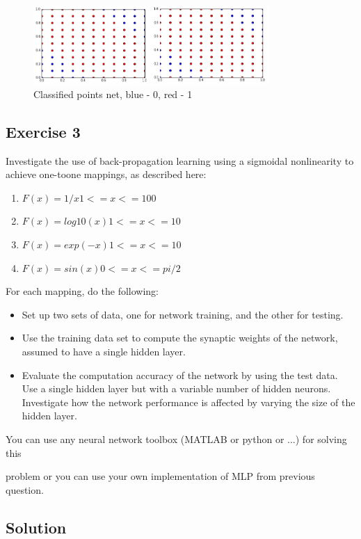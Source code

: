 \documentclass[a4paper, 12pt]{article}
\begin{document}
\begin{figure}[h]
  \centering
  \caption{Classified points net, blue - 0, red - 1 \label{fig:results}}
  \includegraphics[width=0.8\textwidth]{results}
\end{figure}

\subsection{Exercise 3}
Investigate the use of back-propagation learning using a sigmoidal nonlinearity to achieve one-toone mappings, as described here:
\begin{enumerate}
\item $F(x) = 1/x 1<=x<=100$

\item $F(x) = log10(x) 1<=x<=10$

\item $F(x) = exp(-x) 1<=x<=10$

\item $F(x) = sin(x) 0<=x<=pi/2$
\end{enumerate}
For each mapping, do the following:
\begin{itemize}
\item Set up two sets of data, one for network training, and the other for testing.

\item Use the training data set to compute the synaptic weights of the network, assumed to have a single hidden layer.

\item Evaluate the computation accuracy of the network by using the test data. Use a single hidden layer but with a variable number of hidden neurons. Investigate how the network performance is affected by varying the size of the hidden layer.
\end{itemize}


You can use any neural network toolbox (MATLAB or python or ...) for solving this

problem or you can use your own implementation of MLP from previous question.
\subsection{Solution}
\end{document}

